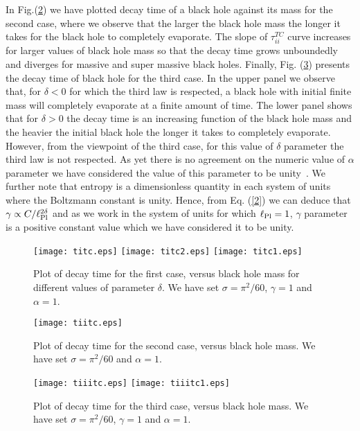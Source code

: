 \documentclass[twocolumn,preprintnumbers,amsmath,nofootinbib,amssymb]{revtex4}
\begin{document}
In Fig.(\ref{fig3}) we have plotted decay time of a black hole
against its mass for the second case, where we observe that the
larger the black hole mass the longer it takes for the black hole
to completely evaporate. The slope of $\tau^{TC}_{ii}$ curve
increases for larger values of black hole mass so that the decay
time grows unboundedly and diverges for massive and super massive
black holes. Finally, Fig. (\ref{fig4}) presents the decay time of
black hole for the third case. In the upper panel we observe that,
for $\delta<0$ for which the third law is respected, a black hole
with initial finite mass will completely evaporate at a finite
amount of time. The lower panel shows that for $\delta>0$ the
decay time is an increasing function of the black hole mass and
the heavier the initial black hole the longer it takes to
completely evaporate. However, from the viewpoint of the third
case, for this value of $\delta$ parameter the third law is not
respected. As yet there is no agreement on the numeric value of
$\alpha$ parameter we have considered the value of this parameter
to be unity~\cite{cqg,agha}. We further note that entropy is a
dimensionless quantity in each system of units where the Boltzmann
constant is unity.  Hence, from Eq. (\ref{2}) we can deduce that
$\gamma\propto C/\ell_{\rm Pl}^{2\delta}$ and as we work in the
system of units for which $\ell_{\rm Pl}=1$, $\gamma$ parameter is
a positive constant value which we have considered it to be unity.
\begin{figure}
    \begin{center}
        \texttt{[image: titc.eps]}
        \texttt{[image: titc2.eps]}
        \texttt{[image: titc1.eps]}
        \caption{Plot of decay time for the first case, versus black hole mass for different values of parameter $\delta$. We have set $\sigma=\pi^2/60$, $\gamma=1$ and $\alpha=1$.}\label{fig2}
    \end{center}
\end{figure}
\begin{figure}
    \begin{center}
        \texttt{[image: tiitc.eps]}
                \caption{Plot of decay time for the second case, versus black hole mass. We have set $\sigma=\pi^2/60$ and $\alpha=1$. }\label{fig3}
    \end{center}
\end{figure}
\begin{figure}
    \begin{center}
        \texttt{[image: tiiitc.eps]}
        \texttt{[image: tiiitc1.eps]}
        \caption{Plot of decay time for the third case, versus black hole mass. We have set $\sigma=\pi^2/60$, $\gamma=1$ and $\alpha=1$. }\label{fig4}
    \end{center}
\end{figure}
\end{document}
